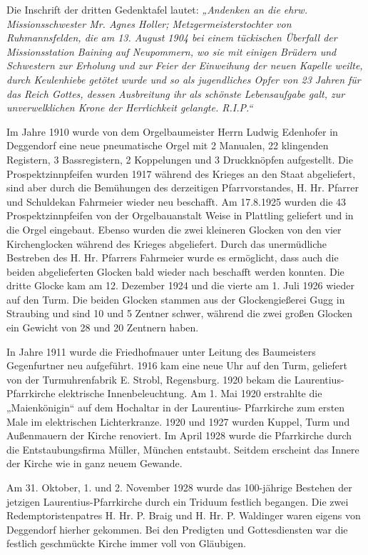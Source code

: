 \documentclass[12pt,a4paper]{book}
\begin{document}
Die Inschrift der dritten Gedenktafel lautet: \emph{„Andenken an die
ehrw. Missionsschwester Mr. Agnes Holler; Metzgermeisterstochter von
Ruhmannsfelden, die am 13. August 1904 bei einem tückischen Überfall der
Missionsstation Baining auf Neupommern, wo sie mit einigen Brüdern und
Schwestern zur Erholung und zur Feier der Einweihung der neuen Kapelle
weilte, durch Keulenhiebe getötet wurde und so als jugendliches Opfer
von 23 Jahren für das Reich Gottes, dessen Ausbreitung ihr als schönste
Lebensaufgabe galt, zur unverwelklichen Krone der Herrlichkeit gelangte.
R.I.P.“}

Im Jahre 1910 wurde von dem Orgelbaumeister Herrn Ludwig Edenhofer in
Deggendorf eine neue pneumatische Orgel mit 2 Manualen, 22 klingenden
Registern, 3 Bassregistern, 2 Koppelungen und 3 Druckknöpfen
aufgestellt. Die Prospektzinnpfeifen wurden 1917 während des Krieges an
den Staat abgeliefert, sind aber durch die Bemühungen des derzeitigen
Pfarrvorstandes, H. Hr. Pfarrer und Schuldekan Fahrmeier wieder neu
beschafft. Am 17.8.1925 wurden die 43 Prospektzinnpfeifen von der
Orgelbauanstalt Weise in Plattling geliefert und in die Orgel eingebaut.
Ebenso wurden die zwei kleineren Glocken von den vier Kirchenglocken
während des Krieges abgeliefert. Durch das unermüdliche Bestreben des H.
Hr. Pfarrers Fahrmeier wurde es ermöglicht, dass auch die beiden
abgelieferten Glocken bald wieder nach beschafft werden konnten. Die
dritte Glocke kam am 12. Dezember 1924 und die vierte am 1. Juli 1926
wieder auf den Turm. Die beiden Glocken stammen aus der Glockengießerei
Gugg in Straubing und sind 10 und 5 Zentner schwer, während die zwei
großen Glocken ein Gewicht von 28 und 20 Zentnern haben.

In Jahre 1911 wurde die Friedhofmauer unter Leitung des Baumeisters
Gegenfurtner neu aufgeführt. 1916 kam eine neue Uhr auf den Turm,
geliefert von der Turmuhrenfabrik E. Strobl, Regensburg. 1920 bekam die
Laurentius-Pfarrkirche elektrische Innenbeleuchtung. Am 1. Mai 1920
erstrahlte die „Maienkönigin“ auf dem Hochaltar in der Laurentius-
Pfarrkirche zum ersten Male im elektrischen Lichterkranze. 1920 und 1927
wurden Kuppel, Turm und Außenmauern der Kirche renoviert. Im April 1928
wurde die Pfarrkirche durch die Entstaubungsfirma Müller, München
entstaubt. Seitdem erscheint das Innere der Kirche wie in ganz neuem
Gewande.

Am 31. Oktober, 1. und 2. November 1928 wurde das 100-jährige Bestehen
der jetzigen Laurentius-Pfarrkirche durch ein Triduum festlich begangen.
Die zwei Redemptoristenpatres H. Hr. P. Braig und H. Hr. P. Waldinger
waren eigens von Deggendorf hierher gekommen. Bei den Predigten und
Gottesdiensten war die festlich geschmückte Kirche immer voll von
Gläubigen.
\end{document}
